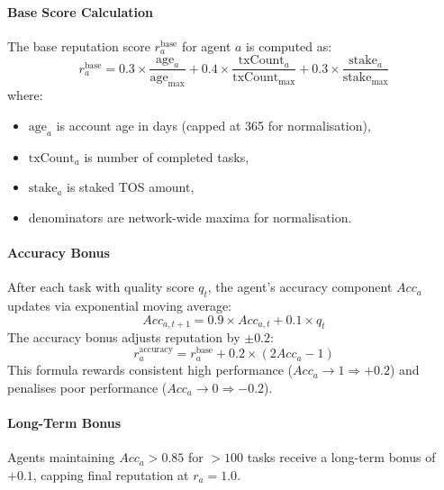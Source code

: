 \documentclass[11pt]{article}
\begin{document}
\paragraph{Base Score Calculation} The base reputation score $r_a^{\text{base}}$ for agent $a$ is computed as:
\begin{equation}
r_a^{\text{base}} = 0.3 \times \frac{\text{age}_a}{\text{age}_{\max}} + 0.4 \times \frac{\text{txCount}_a}{\text{txCount}_{\max}} + 0.3 \times \frac{\text{stake}_a}{\text{stake}_{\max}}
\end{equation}
where:
\begin{itemize}[noitemsep]
  \item $\text{age}_a$ is account age in days (capped at 365 for normalisation),
  \item $\text{txCount}_a$ is number of completed tasks,
  \item $\text{stake}_a$ is staked TOS amount,
  \item denominators are network-wide maxima for normalisation.
\end{itemize}

\paragraph{Accuracy Bonus} After each task with quality score $q_t$, the agent's accuracy component $Acc_a$ updates via exponential moving average:
\begin{equation}
Acc_{a,t+1} = 0.9 \times Acc_{a,t} + 0.1 \times q_t
\end{equation}
The accuracy bonus adjusts reputation by $\pm 0.2$:
\begin{equation}
r_a^{\text{accuracy}} = r_a^{\text{base}} + 0.2 \times (2 Acc_a - 1)
\end{equation}
This formula rewards consistent high performance ($Acc_a \to 1 \Rightarrow +0.2$) and penalises poor performance ($Acc_a \to 0 \Rightarrow -0.2$).

\paragraph{Long-Term Bonus} Agents maintaining $Acc_a > 0.85$ for $>100$ tasks receive a long-term bonus of $+0.1$, capping final reputation at $r_a = 1.0$.
\end{document}

